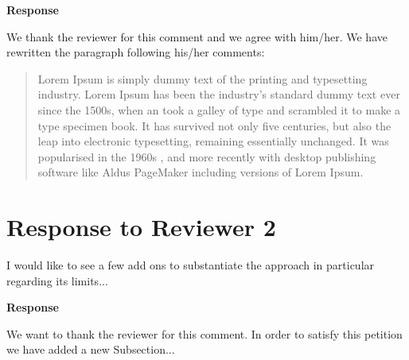 \documentclass[a4paper,twoside,11pt]{reviewresponse}
\begin{document}
\textbf{Response}

We thank the reviewer for this comment and we agree with him/her. We have rewritten the paragraph following his/her comments:  

\begin{quotation}\noindent
Lorem Ipsum is simply dummy text of the printing and typesetting industry. Lorem Ipsum has been the industry's standard dummy text ever since the 1500s, when an  took a galley of type and scrambled it to make a type specimen book. It has survived not only five centuries, but also the leap into electronic typesetting, remaining essentially unchanged. It was popularised in the 1960s , and more recently with desktop publishing software like Aldus PageMaker including versions of Lorem Ipsum.
\end{quotation} 

\clearpage

\section{Response to Reviewer 2}

\rcomment
{
I would like to see a few add ons to substantiate the approach in particular regarding its limits...
}

\textbf{Response}

We want to thank the reviewer for this comment. In order to satisfy this petition we have added a new Subsection...

%
%
\end{document}
